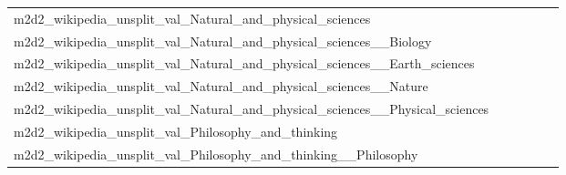 {\begin{longtable}{m{6cm}m{1.7cm}m{1.7cm}m{1.7cm}m{1.7cm}m{1.7cm}}
	m2d2\_wikipedia\_unsplit\_val\_Natural\_and\_physical\_sciences  & \colorbox[HTML]{ffffe5}{\makebox[\mywidth][c]{9.19}} & \colorbox[HTML]{f1f9b4}{\makebox[\mywidth][c]{8.22}} & \colorbox[HTML]{ffffe5}{\makebox[\mywidth][c]{8.81}} & \colorbox[HTML]{81c97c}{\makebox[\mywidth][c]{7.97}} & \colorbox[HTML]{77c578}{\makebox[\mywidth][c]{7.96}}\\
	m2d2\_wikipedia\_unsplit\_val\_Natural\_and\_physical\_sciences\_\_Biology  & \colorbox[HTML]{fdfedc}{\makebox[\mywidth][c]{10.97}} & \colorbox[HTML]{eaf7af}{\makebox[\mywidth][c]{10.70}} & \colorbox[HTML]{ffffe5}{\makebox[\mywidth][c]{11.53}} & \colorbox[HTML]{d4eea0}{\makebox[\mywidth][c]{10.64}} & \colorbox[HTML]{77c578}{\makebox[\mywidth][c]{10.51}}\\
	m2d2\_wikipedia\_unsplit\_val\_Natural\_and\_physical\_sciences\_\_Earth\_sciences  & \colorbox[HTML]{fefee0}{\makebox[\mywidth][c]{11.69}} & \colorbox[HTML]{f7fcbb}{\makebox[\mywidth][c]{11.36}} & \colorbox[HTML]{ffffe5}{\makebox[\mywidth][c]{12.28}} & \colorbox[HTML]{dbf1a4}{\makebox[\mywidth][c]{11.22}} & \colorbox[HTML]{77c578}{\makebox[\mywidth][c]{11.05}}\\
	m2d2\_wikipedia\_unsplit\_val\_Natural\_and\_physical\_sciences\_\_Nature  & \colorbox[HTML]{fefee2}{\makebox[\mywidth][c]{10.43}} & \colorbox[HTML]{f8fcbf}{\makebox[\mywidth][c]{10.11}} & \colorbox[HTML]{ffffe5}{\makebox[\mywidth][c]{10.95}} & \colorbox[HTML]{e4f4ab}{\makebox[\mywidth][c]{10.00}} & \colorbox[HTML]{77c578}{\makebox[\mywidth][c]{9.82}}\\
	m2d2\_wikipedia\_unsplit\_val\_Natural\_and\_physical\_sciences\_\_Physical\_sciences  & \colorbox[HTML]{fefee3}{\makebox[\mywidth][c]{11.48}} & \colorbox[HTML]{ebf7b0}{\makebox[\mywidth][c]{11.09}} & \colorbox[HTML]{ffffe5}{\makebox[\mywidth][c]{11.93}} & \colorbox[HTML]{bbe395}{\makebox[\mywidth][c]{10.98}} & \colorbox[HTML]{77c578}{\makebox[\mywidth][c]{10.90}}\\
	m2d2\_wikipedia\_unsplit\_val\_Philosophy\_and\_thinking  & \colorbox[HTML]{f6fbb8}{\makebox[\mywidth][c]{11.83}} & \colorbox[HTML]{e5f4ab}{\makebox[\mywidth][c]{11.72}} & \colorbox[HTML]{ffffe5}{\makebox[\mywidth][c]{13.04}} & \colorbox[HTML]{c3e698}{\makebox[\mywidth][c]{11.60}} & \colorbox[HTML]{77c578}{\makebox[\mywidth][c]{11.45}}\\
	m2d2\_wikipedia\_unsplit\_val\_Philosophy\_and\_thinking\_\_Philosophy  & \colorbox[HTML]{fdfede}{\makebox[\mywidth][c]{12.00}} & \colorbox[HTML]{e0f2a8}{\makebox[\mywidth][c]{11.61}} & \colorbox[HTML]{ffffe5}{\makebox[\mywidth][c]{12.66}} & \colorbox[HTML]{d4eea0}{\makebox[\mywidth][c]{11.57}} & \colorbox[HTML]{77c578}{\makebox[\mywidth][c]{11.43}}\\

\end{longtable}}
